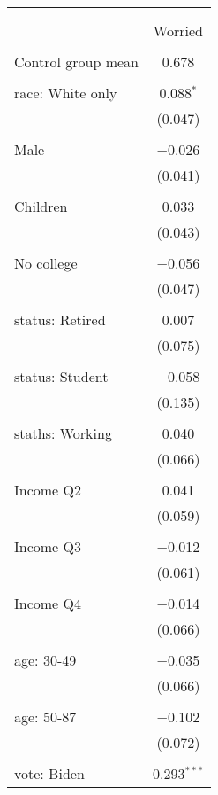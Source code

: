 
\begin{tabular}{@{\extracolsep{5pt}}lc} 
\\[-1.8ex]\hline 
\hline \\[-1.8ex] 
\\[-1.8ex] & Worried \\ 
\hline \\[-1.8ex] 
 Control group mean & 0.678  \\ \hline \\[-1.8ex] race: White only & 0.088$^{*}$ \\ 
  & (0.047) \\ 
  & \\ 
 Male & $-$0.026 \\ 
  & (0.041) \\ 
  & \\ 
 Children & 0.033 \\ 
  & (0.043) \\ 
  & \\ 
 No college & $-$0.056 \\ 
  & (0.047) \\ 
  & \\ 
 status: Retired & 0.007 \\ 
  & (0.075) \\ 
  & \\ 
 status: Student & $-$0.058 \\ 
  & (0.135) \\ 
  & \\ 
 staths: Working & 0.040 \\ 
  & (0.066) \\ 
  & \\ 
 Income Q2 & 0.041 \\ 
  & (0.059) \\ 
  & \\ 
 Income Q3 & $-$0.012 \\ 
  & (0.061) \\ 
  & \\ 
 Income Q4 & $-$0.014 \\ 
  & (0.066) \\ 
  & \\ 
 age: 30-49 & $-$0.035 \\ 
  & (0.066) \\ 
  & \\ 
 age: 50-87 & $-$0.102 \\ 
  & (0.072) \\ 
  & \\ 
 vote: Biden & 0.293$^{***}$ \\ 

\end{tabular}
